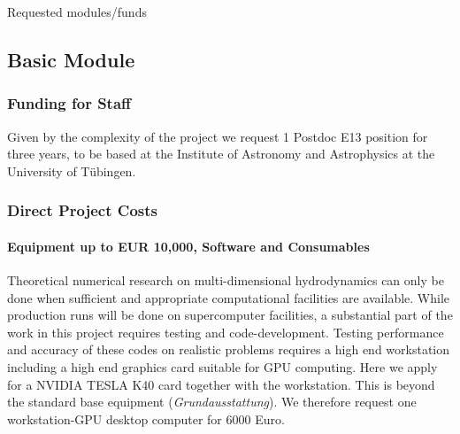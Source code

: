 \documentclass[10pt,fleqn,twoside]{article}
\begin{document}
\begingroup
\renewcommand{\section}[2]{}%
%


\endgroup


\section{Requested modules/funds}
\renewcommand{\leftmark}{\sc Requested modules/funds}

\subsection{Basic Module}

\subsubsection{Funding for Staff}

Given by the complexity of the project we request 1 Postdoc E13 position for three years,
to be based at the Institute of Astronomy and Astrophysics at the University of T\"ubingen.

\subsubsection{Direct Project Costs}

\paragraph{Equipment up to EUR 10,000, Software and Consumables}
Theoretical numerical research on multi-dimensional hydrodynamics can only be done when sufficient and
appropriate computational facilities are available. While production runs
will be done on supercomputer facilities, a substantial part of the work in
this project requires testing and code-development.
Testing performance and accuracy of these codes on realistic problems
requires a high end workstation including a high end graphics card suitable for
GPU computing. Here we apply for a NVIDIA TESLA K40 card together with the workstation.
This is beyond the standard base equipment (\textit{Grundausstattung}).
We therefore request one workstation-GPU desktop computer for 6000 Euro.
\end{document}
